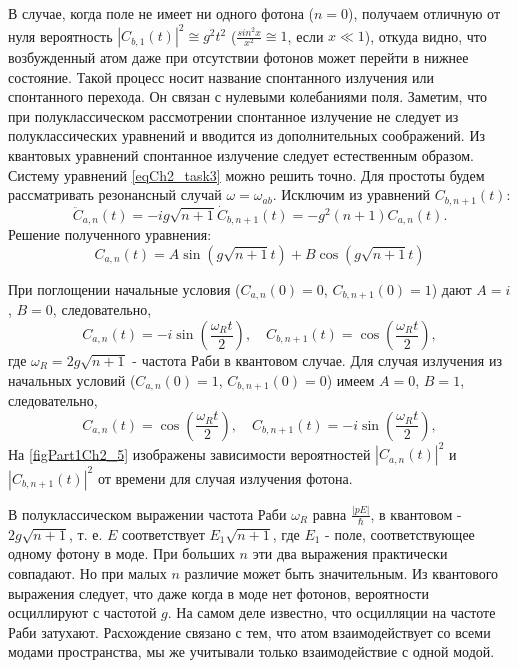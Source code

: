 В случае, когда поле не имеет ни одного фотона  ($n = 0$),
получаем отличную от нуля вероятность 
$\left|C_{b, 1}\left(t\right)\right|^2 \cong g^2 t^2$
($\frac{sin^2 x}{x^2} \cong 1$,  если
$x \ll 1$), откуда видно, что возбужденный атом даже при
отсутствии фотонов может перейти в нижнее состояние. Такой процесс
носит название спонтанного излучения или спонтанного перехода. Он
связан с нулевыми колебаниями поля. Заметим, что при полуклассическом
рассмотрении спонтанное излучение не следует из полуклассических
уравнений и вводится из дополнительных соображений. Из квантовых
уравнений спонтанное излучение следует естественным образом. 
Систему уравнений \eqref{eqCh2_task3} можно решить точно. Для простоты
будем рассматривать резонансный случай $\omega = \omega_{ab}$.
Исключим из уравнений $C_{b, n + 1}\left(t\right)$:   
\[
{\ddot C}_{a,n}\left(t\right) = -i g \sqrt{n + 1}
{\dot C}_{b, n + 1}\left(t\right) = -g^2 \left(n + 1\right)
C_{a,n}\left(t\right). 
\]
Решение полученного уравнения:
\begin{equation}
C_{a,n}\left(t\right) = A \sin\left(g \sqrt{n + 1} t\right) +
B \cos\left(g \sqrt{n + 1} t\right)
\nonumber
\end{equation}

При поглощении начальные условия ($C_{a,n}\left(0\right) = 0$, $C_{b,n+1}\left(0\right)
= 1$) дают $A = i$, $B = 0$, следовательно,  
\begin{equation}
C_{a,n}\left(t\right) = -i \sin\left(\frac{\omega_R t}{2}\right), \quad
C_{b, n + 1}\left(t\right) = \cos\left(\frac{\omega_R t}{2}\right),
\label{eqPart1RabiAbsorbtion}
\end{equation}
где $\omega_R = 2g\sqrt{n + 1}$ - частота Раби в квантовом случае. Для случая
излучения из начальных условий ($C_{a,n}\left(0\right) = 1$,
$C_{b,n+1}\left(0\right) = 0$) имеем $A = 0$, $B = 1$, следовательно, 
\begin{equation}
C_{a,n}\left(t\right) = \cos\left(\frac{\omega_R t}{2}\right), \quad
C_{b, n + 1}\left(t\right) = -i \sin\left(\frac{\omega_R t}{2}\right),
\label{eqPart1RabiEmission}
\end{equation}
На \autoref{figPart1Ch2_5} изображены зависимости вероятностей 
$\left|C_{a,n}\left(t\right)\right|^2$ и 
$\left|C_{b, n + 1}\left(t\right)\right|^2$  от времени для случая
излучения фотона.


В полуклассическом выражении частота Раби $\omega_R$ равна 
$\frac{\left|p E\right|}{\hbar}$,  в квантовом - $2g\sqrt{n + 1}$,
т. е. $E$  соответствует $E_1\sqrt{n + 1}$,  где $E_1$ - поле,
соответствующее одному фотону в моде.  При больших $n$ эти два
выражения практически совпадают. Но при малых $n$ различие может быть 
значительным. Из квантового  выражения следует, что даже когда в моде
нет фотонов, вероятности осциллируют с частотой  $g$.  На самом деле 
известно, что осцилляции на частоте Раби затухают. Расхождение связано
с тем, что атом взаимодействует со всеми модами пространства, мы же
учитывали только взаимодействие с одной модой.  

